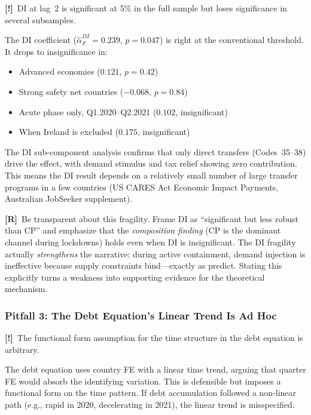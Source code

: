 \documentclass[12pt, a4paper]{article}
\newcommand{\concern}[1]{\textcolor{concern}{\textbf{[!]}~#1}}
\newcommand{\recommend}[1]{\textcolor{recommend}{\textbf{[R]}~#1}}
\begin{document}
\concern{DI at lag~2 is significant at 5\% in the full sample but loses significance in several subsamples.}

The DI coefficient ($\hat{\alpha}_F^{DI} = 0.239$, $p = 0.047$) is right at the conventional threshold. It drops to insignificance in:
\begin{itemize}
    \item Advanced economies ($0.121$, $p = 0.42$)
    \item Strong safety net countries ($-0.068$, $p = 0.84$)
    \item Acute phase only, Q1.2020--Q2.2021 ($0.102$, insignificant)
    \item When Ireland is excluded ($0.175$, insignificant)
\end{itemize}

The DI sub-component analysis confirms that only direct transfers (Codes~35--38) drive the effect, with demand stimulus and tax relief showing zero contribution. This means the DI result depends on a relatively small number of large transfer programs in a few countries (US CARES Act Economic Impact Payments, Australian JobSeeker supplement).

\recommend{Be transparent about this fragility.} Frame DI as ``significant but less robust than CP'' and emphasize that the \textit{composition finding} (CP is the dominant channel during lockdowns) holds even when DI is insignificant. The DI fragility actually \textit{strengthens} the narrative: during active containment, demand injection is ineffective because supply constraints bind---exactly as \citet{guerrieri2022} predict. Stating this explicitly turns a weakness into supporting evidence for the theoretical mechanism.


\subsubsection*{Pitfall 3: The Debt Equation's Linear Trend Is Ad Hoc}

\concern{The functional form assumption for the time structure in the debt equation is arbitrary.}

The debt equation uses country FE with a linear time trend, arguing that quarter FE would absorb the identifying variation. This is defensible but imposes a functional form on the time pattern. If debt accumulation followed a non-linear path (e.g., rapid in 2020, decelerating in 2021), the linear trend is misspecified.
\end{document}
